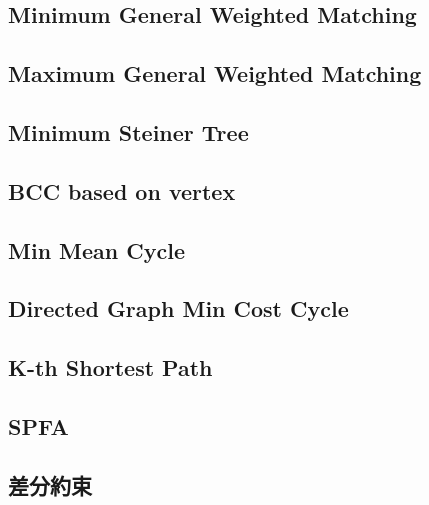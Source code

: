 \documentclass[a4paper,10pt,twocolumn,oneside]{article}
\begin{document}
\subsection{Minimum General Weighted Matching}


\subsection{Maximum General Weighted Matching}


\subsection{Minimum Steiner Tree}


\subsection{BCC based on vertex}


\subsection{Min Mean Cycle}


\subsection{Directed Graph Min Cost Cycle}


\subsection{K-th Shortest Path}


\subsection{SPFA}


\subsection{差分約束}

%
\end{document}
